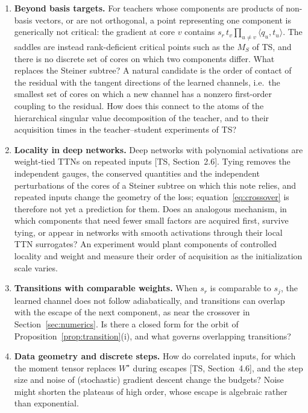 \documentclass[11pt]{article}
\newcommand{\ip}[2]{\langle #1,#2\rangle}
\newcommand{\TS}{\textsf{TS}}
\newcommand{\ts}[1]{[\TS, #1]}
\theoremstyle{definition}
\numberwithin{equation}{section}
\begin{document}
\begin{enumerate}[label=\textbf{Q\arabic*.},leftmargin=*,itemsep=3pt]
\item \textbf{Beyond basis targets.} For teachers whose components are products of non-basis vectors, or are not orthogonal, a point representing one component is generically not critical: the gradient at core $v$ contains $s_r\,t_v\prod_{u\neq v}\ip{q_u}{t_u}$. The saddles are instead rank-deficient critical points such as the $M_S$ of \TS, and there is no discrete set of cores on which two components differ. What replaces the Steiner subtree? A natural candidate is the order of contact of the residual with the tangent directions of the learned channels, i.e.\ the smallest set of cores on which a new channel has a nonzero first-order coupling to the residual. How does this connect to the atoms of the hierarchical singular value decomposition of the teacher, and to their acquisition times in the teacher--student experiments of \TS?
\item \textbf{Locality in deep networks.} Deep networks with polynomial activations are weight-tied TTNs on repeated inputs \ts{Section~2.6}. Tying removes the independent gauges, the conserved quantities and the independent perturbations of the cores of a Steiner subtree on which this note relies, and repeated inputs change the geometry of the loss; equation~\eqref{eq:crossover} is therefore not yet a prediction for them. Does an analogous mechanism, in which components that need fewer small factors are acquired first, survive tying, or appear in networks with smooth activations through their local TTN surrogates? An experiment would plant components of controlled locality and weight and measure their order of acquisition as the initialization scale varies.
\item \textbf{Transitions with comparable weights.} When $s_r$ is comparable to $s_j$, the learned channel does not follow adiabatically, and transitions can overlap with the escape of the next component, as near the crossover in Section~\ref{sec:numerics}. Is there a closed form for the orbit of Proposition~\ref{prop:transition}(i), and what governs overlapping transitions?
\item \textbf{Data geometry and discrete steps.} How do correlated inputs, for which the moment tensor replaces $W^\star$ during escapes \ts{Section~4.6}, and the step size and noise of (stochastic) gradient descent change the budgets? Noise might shorten the plateaus of high order, whose escape is algebraic rather than exponential.
\end{enumerate}

\appendix
\end{document}
